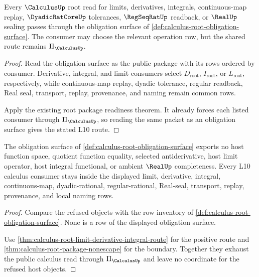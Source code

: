 \begin{theorem}
\label{thm:calculus-root-limit-derivative-integral-route}
Every $\CalculusUp$ root read for limits, derivatives, integrals, continuous-map replay, $\DyadicRatCoreUp$ tolerances, $\RegSeqRatUp$ readback, or $\RealUp$ sealing passes through the obligation surface of \autoref{def:calculus-root-obligation-surface}. The consumer may choose the relevant operation row, but the shared route remains $\Pi_{\CalculusUp}$.
\end{theorem}
\begin{proof}
Read the obligation surface as the public package with its rows ordered by consumer. Derivative, integral, and limit consumers select $D_{\mathrm{root}}$, $I_{\mathrm{root}}$, or $L_{\mathrm{root}}$, respectively, while continuous-map replay, dyadic tolerance, regular readback, Real seal, transport, replay, provenance, and naming remain common rows.

Apply the existing root package readiness theorem. It already forces each listed consumer through $\Pi_{\CalculusUp}$, so reading the same packet as an obligation surface gives the stated L10 route.
\end{proof}

\begin{theorem}
\label{thm:calculus-root-l10-nonescape}
The obligation surface of \autoref{def:calculus-root-obligation-surface} exports no host function space, quotient function equality, selected antiderivative, host limit operator, host integral functional, or ambient $\RealUp$ completeness. Every L10 calculus consumer stays inside the displayed limit, derivative, integral, continuous-map, dyadic-rational, regular-rational, Real-seal, transport, replay, provenance, and local naming rows.
\end{theorem}
\begin{proof}
Compare the refused objects with the row inventory of \autoref{def:calculus-root-obligation-surface}. None is a row of the displayed obligation surface.

Use \autoref{thm:calculus-root-limit-derivative-integral-route} for the positive route and \autoref{thm:calculus-root-package-nonescape} for the boundary. Together they exhaust the public calculus read through $\Pi_{\CalculusUp}$ and leave no coordinate for the refused host objects.
\end{proof}

